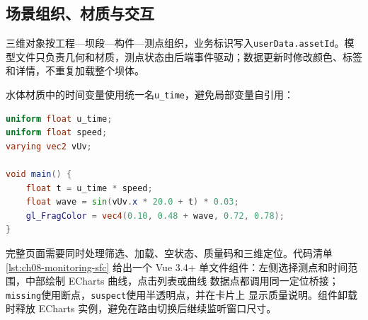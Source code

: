 \subsection{场景组织、材质与交互}

三维对象按工程—坝段—构件—测点组织，业务标识写入\texttt{userData.assetId}。模型文件只负责几何和材质，测点状态由后端事件驱动；数据更新时修改颜色、标签和详情，不重复加载整个坝体。

水体材质中的时间变量使用统一名\texttt{u\_time}，避免局部变量自引用：

\begin{lstlisting}[label={lst:ch08-glsl},language=GLSL,caption={水面波动着色器}]
uniform float u_time;
uniform float speed;
varying vec2 vUv;

void main() {
    float t = u_time * speed;
    float wave = sin(vUv.x * 20.0 + t) * 0.03;
    gl_FragColor = vec4(0.10, 0.48 + wave, 0.72, 0.78);
}
\end{lstlisting}

完整页面需要同时处理筛选、加载、空状态、质量码和三维定位。代码清单\ref{lst:ch08-monitoring-sfc}
给出一个 Vue 3.4+ 单文件组件：左侧选择测点和时间范围，中部绘制 ECharts 曲线，点击列表或曲线
数据点都调用同一定位桥接；\texttt{missing}使用断点，\texttt{suspect}使用半透明点，并在卡片上
显示质量说明。组件卸载时释放 ECharts 实例，避免在路由切换后继续监听窗口尺寸。

